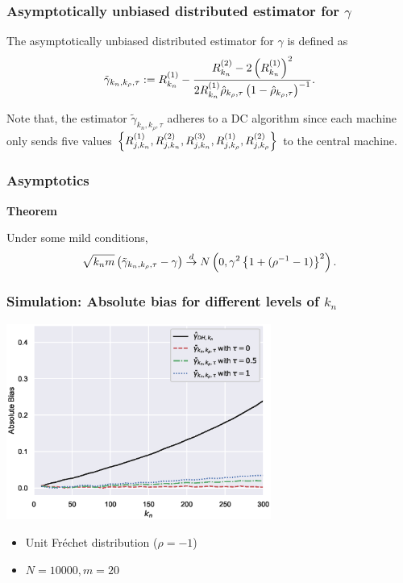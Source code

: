 \documentclass{beamer}
\begin{document}
\begin{frame}
    \frametitle{Asymptotically unbiased distributed estimator for $\gamma$}
The asymptotically unbiased distributed estimator for $\gamma$ is defined as 
$$
\tilde{\gamma}_{k_n,k_{\rho},\tau}:=R_{k_n}^{(1)} - \frac{R_{k_n}^{(2)}-2\left(R_{k_n}^{(1)} \right)^2 }{2R_{k_n}^{(1)} \hat{\rho}_{k_{\rho},\tau}\left(1-\hat{\rho}_{k_{\rho},\tau}\right)^{-1}}.
$$
    

Note that, the estimator $\tilde{\gamma}_{k_n,k_{\rho},\tau}$ adheres to a DC algorithm since each machine only sends five values $\left\{R_{j,k_n}^{(1)},R_{j,k_n}^{(2)},R_{j,k_n}^{(3)},R_{j,k_{\rho}}^{(1)},R_{j,k_{\rho}}^{(2)}\right\}$ to the central machine.

\end{frame}
\begin{frame}
    \frametitle{Asymptotics}
{\bf Theorem} 

Under some mild conditions, 
$$
\sqrt{k_nm}\left(\tilde{\gamma}_{k_n,k_{\rho},\tau}-\gamma\right)
\stackrel{d}{\to} N\left(0,\gamma^2\left\{1+(\rho^{-1}-1)\right\}^2\right).
$$
    

\end{frame}


\begin{frame}
    \frametitle{Simulation: Absolute bias for different levels of $k_n$}
\begin{center}
     \includegraphics[width=0.65\textwidth]{program/simu1/figs/Frechet_m20_0.eps}
\end{center}
    \vspace{-2ex}
    \begin{itemize}
        \item Unit Fr\'echet distribution ($\rho = -1$)
        \item  $N = 10000, m=20$
    \end{itemize}

\end{frame}
\end{document}
